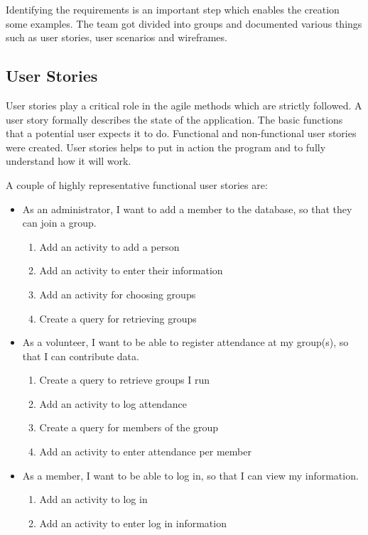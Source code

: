 \documentclass{l3proj}
\begin{document}
Identifying the requirements is an important step which enables the creation some examples. The team got divided into groups and documented various things such as user stories, user scenarios and wireframes.

\subsection{User Stories}
\label{user_stories}

User stories \cite{UserStories} play a critical role in the agile methods which are strictly followed. A user story formally describes the state of the application. The basic functions that a potential user expects it to do. Functional and non-functional user stories were created. User stories helps to put in action the program and to fully understand how it will work.

A couple of highly representative functional user stories are:
\begin{itemize}

\item As an administrator, I want to add a member to the database, so that they can join a group.

	\begin{enumerate}
 	\item Add an activity to add a person
 	
	\item Add an activity to enter their information

	\item Add an activity for choosing groups

	\item Create a query for retrieving groups
	\end{enumerate}
\item As a volunteer, I want to be able to register attendance at my group(s), so that I can contribute data.

	\begin{enumerate}
	\item Create a query to retrieve groups I run
	
	\item Add an activity to log attendance
	
	\item Create a query for members of the group
	
	\item Add an activity to enter attendance per member
	
	\end{enumerate}

\item As a member, I want to be able to log in, so that I can view my information.

	\begin{enumerate}
	
	\item Add an activity to log in
	\item Add an activity to enter log in information
	
	\end{enumerate}

\end{itemize}
\end{document}
